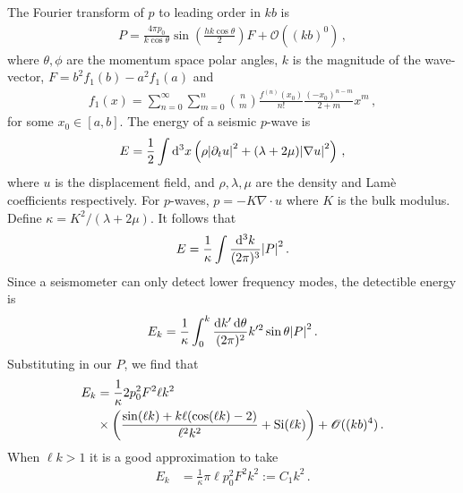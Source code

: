 \documentclass[prd,reprint,10pt]{revtex4-1}
\newcommand*\diff{\mathop{}\!\mathrm{d}}
\newcommand*\scr[1]{\mathscr{#1}}
\newcommand*\te[1]{\text{#1}}
\newcommand*\p[1]{\left(#1\right)}
\newcommand*\f[2]{\frac{#1}{#2}}
\begin{document}
The Fourier transform of $p$ to leading order in $kb$ is
\begin{align}
P = \f{4\pi p_0}{k\cos\theta}\sin\p{\f{h k\cos\theta}{2}}F+\scr O((kb)^0)\,,
\end{align}
where $\theta,\phi$ are the momentum space polar angles, $k$ is the magnitude of the wave-vector, $F = b^2f_1(b)-a^2f_1(a)$ and
\begin{align}
f_1(x) = \sum_{n=0}^\infty\sum_{m=0}^n\binom{n}{m}\f{f^{(n)}(x_0)}{n!}\f{(-x_0)^{n-m}}{2+m}x^{m}\,,
\end{align}
for some $x_0\in[a,b]$. The energy of a seismic $p$-wave is
\begin{align}
E = \f12\int\diff^3 x\p{ \rho\abs{\partial_t u}^2+(\lambda+2\mu)\abs{\nabla u}^2}\,,
\end{align}
where $u$ is the displacement field, and $\rho,\lambda,\mu$ are the density and Lam\`e coefficients respectively. For $p$-waves, $p = -K\nabla\cdot u$ where $K$ is the bulk modulus. Define $\kappa = K^2/(\lambda + 2\mu)$. It follows that
\begin{align}
E =\f1\kappa\int\f{\diff^3 k}{(2\pi)^3}\abs{P}^2\,.
\end{align}
Since a seismometer can only detect lower frequency modes, the detectible energy is
\begin{align}
E_k = \f1\kappa\int_0^k\f{\diff k'\diff\theta}{(2\pi)^2}k'^2\sin\theta\abs{P}^2\,.
\end{align}
Substituting in our $P$, we find that
\begin{align}
\notag E_k&=\f1\kappa 2p_0^2F^2\ell k^2\\\notag&\times\p{\f{\sin(\ell k)+k\ell(\cos(\ell k)-2)}{\ell^2 k^2}+\te{Si}(\ell k)}+\scr O((kb)^4)\,.
\end{align}
When $\ell k>1$ it is a good approximation to take
\begin{align}
E_k&=\f1\kappa \pi\ell p_0^2F^2 k^2:=C_1 k^2\,.
\end{align}
\end{document}
